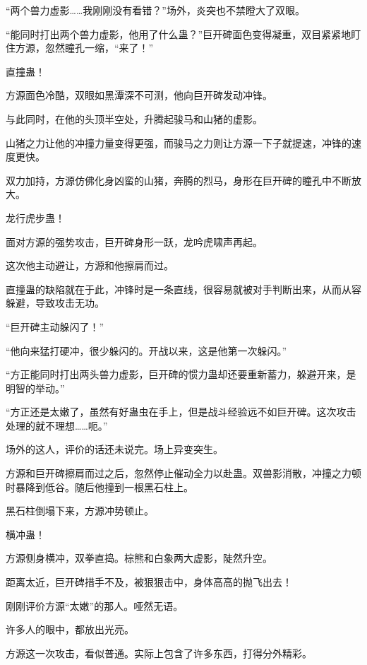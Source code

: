 
\begin{this_body}

“两个兽力虚影……我刚刚没有看错？”场外，炎突也不禁瞪大了双眼。

“能同时打出两个兽力虚影，他用了什么蛊？”巨开碑面色变得凝重，双目紧紧地盯住方源，忽然瞳孔一缩，“来了！”

直撞蛊！

方源面色冷酷，双眼如黑潭深不可测，他向巨开碑发动冲锋。

与此同时，在他的头顶半空处，升腾起骏马和山猪的虚影。

山猪之力让他的冲撞力量变得更强，而骏马之力则让方源一下子就提速，冲锋的速度更快。

双力加持，方源仿佛化身凶蛮的山猪，奔腾的烈马，身形在巨开碑的瞳孔中不断放大。

龙行虎步蛊！

面对方源的强势攻击，巨开碑身形一跃，龙吟虎啸声再起。

这次他主动避让，方源和他擦肩而过。

直撞蛊的缺陷就在于此，冲锋时是一条直线，很容易就被对手判断出来，从而从容躲避，导致攻击无功。

“巨开碑主动躲闪了！”

“他向来猛打硬冲，很少躲闪的。开战以来，这是他第一次躲闪。”

“方正能同时打出两头兽力虚影，巨开碑的惯力蛊却还要重新蓄力，躲避开来，是明智的举动。”

“方正还是太嫩了，虽然有好蛊虫在手上，但是战斗经验远不如巨开碑。这次攻击处理的就不理想……呃。”

场外的这人，评价的话还未说完。场上异变突生。

方源和巨开碑擦肩而过之后，忽然停止催动全力以赴蛊。双兽影消散，冲撞之力顿时暴降到低谷。随后他撞到一根黑石柱上。

黑石柱倒塌下来，方源冲势顿止。

横冲蛊！

方源侧身横冲，双拳直捣。棕熊和白象两大虚影，陡然升空。

距离太近，巨开碑措手不及，被狠狠击中，身体高高的抛飞出去！

刚刚评价方源“太嫩”的那人。哑然无语。

许多人的眼中，都放出光亮。

方源这一次攻击，看似普通。实际上包含了许多东西，打得分外精彩。


\end{this_body}
